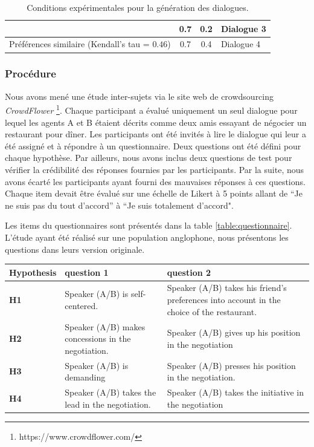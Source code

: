{\begin{table}[h]
\begin{tabular}{ |l|c|c|l| }
						\newline   &0.7 & 0.2 & Dialogue 3\\ 
						\hline
						\newline Préférences similaire (Kendall's tau = $0.46$) & 0.7 & 0.4 & Dialogue 4\\
						\hline
					\end{tabular}
					\caption{Conditions expérimentales pour la génération des dialogues.} 
					\label{table:conditions}
				\end{table}
		
			\subsubsection{Procédure}
					\label{sec:questionnaire}
					Nous avons mené une étude inter-sujets via le site web de crowdsourcing  \emph {CrowdFlower} \footnote {https://www.crowdflower.com/}.
					Chaque participant a évalué uniquement un seul dialogue pour lequel les agents A et B étaient décrits comme deux amis essayant de négocier un restaurant pour dîner.
					Les participants ont été invités à lire le dialogue qui leur a été assigné et à répondre à un questionnaire.
					Deux questions ont été défini pour chaque hypothèse. Par ailleurs, nous avons inclus deux questions de test pour vérifier la crédibilité des réponses fournies par les participants. Par la suite, nous avons écarté les participants ayant fourni des mauvaises réponses à ces questions. 
					Chaque item devait être évalué sur une échelle de Likert à 5 points allant de ``Je ne suis pas du tout d'accord'' à ``Je suis totalement d'accord".
			
					Les items du questionnaires sont présentés dans la table \ref{table:questionnaire}. L'étude ayant été réalisé sur une population anglophone, nous présentons les questions dans leurs version originale. 
						
								\begin{table}[h]
																\centering
								\begin{tabular}{|p{1.75cm}|p{4cm}|p{4.8cm}|}

									\hline
									Hypothesis &question 1& question 2 \\
									\hline
									\textbf{H1} &Speaker (A/B) is self-centered. &Speaker (A/B) takes his friend's preferences into account in the choice of the restaurant.\\
									\hline
									\textbf{H2} &Speaker (A/B) makes concessions in the negotiation.&Speaker (A/B) gives up his position in the negotiation\\
									\hline
									\textbf{H3} & Speaker (A/B) is demanding&Speaker (A/B) presses his position in the negotiation. \\
									\hline
									\textbf{H4} &Speaker (A/B) takes the lead in the negotiation.&Speaker (A/B) takes the initiative in the negotiation \\
									\hline
								\end{tabular}
							

\end{table}}
